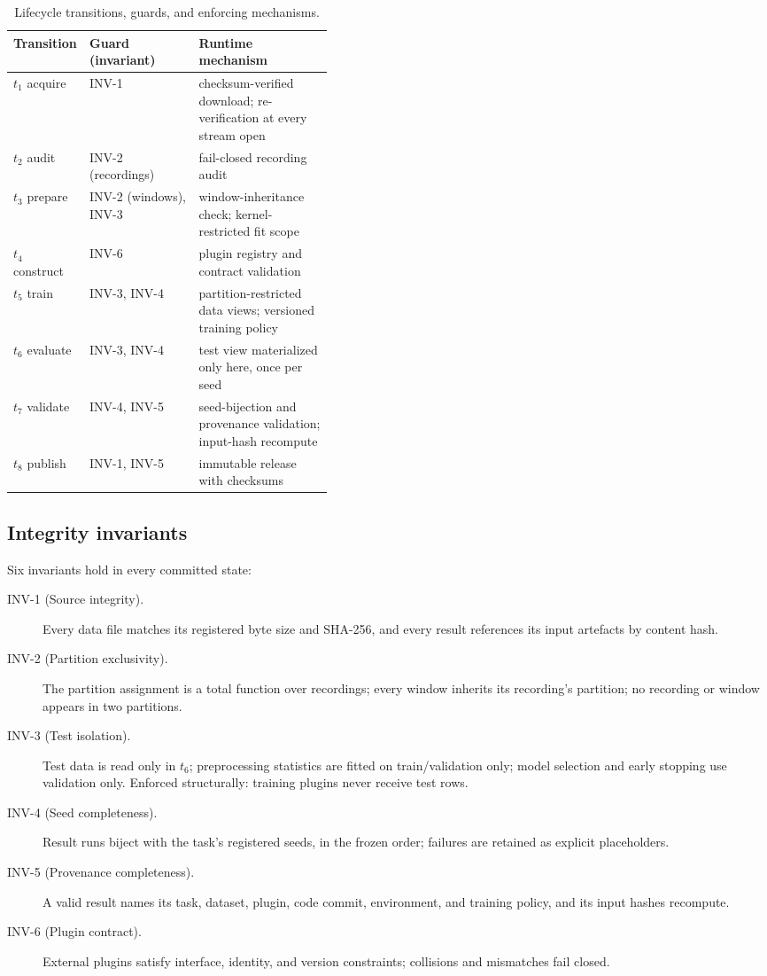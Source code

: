 \begin{table}[t]
\centering\small
\caption{Lifecycle transitions, guards, and enforcing mechanisms.}
\label{tab:transitions}
\begin{tabular}{@{}llp{0.42\linewidth}@{}}
\toprule
Transition & Guard (invariant) & Runtime mechanism \\
\midrule
$t_1$ acquire & INV-1 & checksum-verified download; re-verification at every stream open \\
$t_2$ audit & INV-2 (recordings) & fail-closed recording audit \\
$t_3$ prepare & INV-2 (windows), INV-3 & window-inheritance check; kernel-restricted fit scope \\
$t_4$ construct & INV-6 & plugin registry and contract validation \\
$t_5$ train & INV-3, INV-4 & partition-restricted data views; versioned training policy \\
$t_6$ evaluate & INV-3, INV-4 & test view materialized only here, once per seed \\
$t_7$ validate & INV-4, INV-5 & seed-bijection and provenance validation; input-hash recompute \\
$t_8$ publish & INV-1, INV-5 & immutable release with checksums \\
\bottomrule
\end{tabular}
\end{table}

\subsection{Integrity invariants}

Six invariants hold in every committed state:

\begin{description}
\item[INV-1 (Source integrity).] Every data file matches its registered byte
size and SHA-256, and every result references its input artefacts by content
hash.
\item[INV-2 (Partition exclusivity).] The partition assignment is a total
function over recordings; every window inherits its recording's partition;
no recording or window appears in two partitions.
\item[INV-3 (Test isolation).] Test data is read only in $t_6$; preprocessing
statistics are fitted on train/validation only; model selection and early
stopping use validation only. Enforced structurally: training plugins never
receive test rows.
\item[INV-4 (Seed completeness).] Result runs biject with the task's
registered seeds, in the frozen order; failures are retained as explicit
placeholders.
\item[INV-5 (Provenance completeness).] A valid result names its task,
dataset, plugin, code commit, environment, and training policy, and its
input hashes recompute.
\item[INV-6 (Plugin contract).] External plugins satisfy interface, identity,
and version constraints; collisions and mismatches fail closed.
\end{description}

